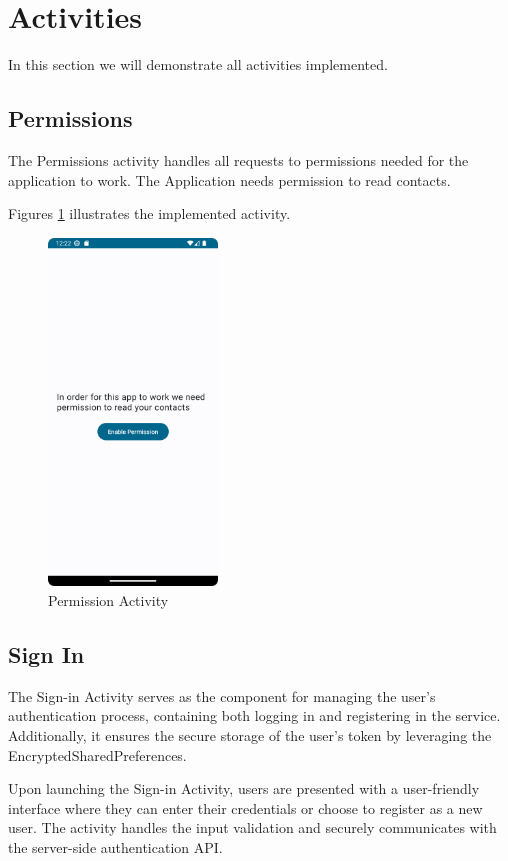 \section{Activities}
In this section we will demonstrate all activities implemented.
\subsection{Permissions}
The Permissions activity handles all requests to permissions needed for the application to work.
The Application needs permission to read contacts.

Figures \ref{fig:PA} illustrates the implemented activity. 

\begin{figure}[!ht]
	\centering
	\includegraphics[trim={0cm 0cm 0 0cm}, width=0.4\textwidth]{./Chapter6/Figures/PermissionActivity}
	\caption{Permission Activity}
	\label{fig:PA}
\end{figure}


\subsection{Sign In}

The Sign-in Activity serves as the component for managing the user's authentication process, containing both logging in and registering in the service. Additionally, it ensures the secure storage of the user's token by leveraging the EncryptedSharedPreferences.

Upon launching the Sign-in Activity, users are presented with a user-friendly interface where they can enter their credentials or choose to register as a new user. The activity handles the input validation and securely communicates with the server-side authentication API.

